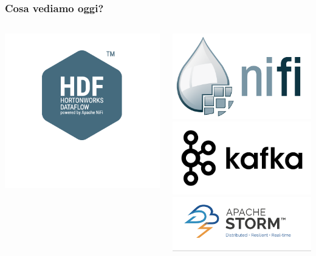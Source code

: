\documentclass[10pt,xcolor=dvipsnames,flushleft]{beamer}
\begin{document}
\begin{frame}
\frametitle{Cosa vediamo oggi?}
\begin{columns}
	\begin{column}{0.5\textwidth}
		\includegraphics[scale=0.4]{img/icon-hdf}
	\end{column}
	\begin{column}{0.5\textwidth}
		\includegraphics[scale=0.2]{img/nifi-logo}\\
		\includegraphics[scale=0.2]{img/kafka-logo}\\
		\includegraphics[scale=0.2]{img/storm-logo}
	\end{column}
\end{columns}

\end{frame}
\end{document}
